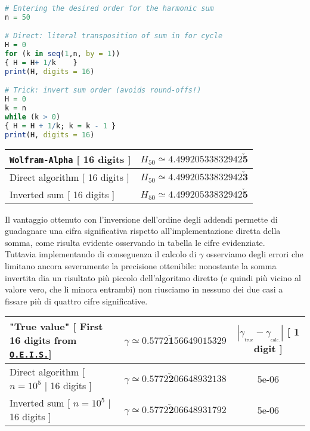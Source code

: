 \begin{lstlisting}[language=R, style=Rstyle, caption= \texttt{R} code for summing harmonic numbers, xleftmargin=.02\textwidth]
# Entering the desired order for the harmonic sum
n = 50

# Direct: literal transposition of sum in for cycle
H = 0
for (k in seq(1,n, by = 1))
{ H = H+ 1/k	} 
print(H, digits = 16)

# Trick: invert sum order (avoids round-offs!)
H = 0
k = n
while (k > 0)
{ H = H + 1/k; k = k - 1 }
print(H, digits = 16)
\end{lstlisting}

\bgroup
\def\arraystretch{2}
\begin{center}
	\begin{tabular}{l||c}
		\texttt{Wolfram-Alpha} [ 16 digits ]&$H_{50} \simeq 4.49920533832942\mathbf{\check{5}}$ \\  \hline
		Direct algorithm [ 16 digits ]&$H_{50} \simeq 4.49920533832942\mathbf{\check{3}}$ \\ 
		Inverted sum [ 16 digits ]&$H_{50} \simeq4.49920533832942\mathbf{\check{5}}$ \\ 
	\end{tabular}
\end{center}
\egroup

\noindent Il vantaggio ottenuto con l'inversione dell'ordine degli addendi permette di guadagnare una cifra significativa rispetto all'implementazione diretta della somma, come risulta evidente osservando in tabella le cifre evidenziate. \\

\noindent Tuttavia implementando di conseguenza il calcolo di $\gamma$ osserviamo degli errori che limitano ancora severamente la precisione ottenibile: nonostante la somma invertita dia un risultato più piccolo dell'algoritmo diretto (e quindi più vicino al valore vero, che li minora entrambi) non riusciamo in nessuno dei due casi a fissare più di quattro cifre significative. 

\bgroup
\def\arraystretch{2}
\begin{center}
	\begin{tabular}{l||c|c}
		"True value" [ First 16 digits from \href{https://oeis.org/A001620}{\texttt{O.E.I.S.}}] &$\gamma \simeq 0.5772\mathbf{\check{1}}56649015329$  &$|\gamma_{_\mathrm{true}}  - \gamma_{_\mathrm{calc.}} |$ [ 1 digit ]\\  \hline
		Direct algorithm [ $n=10^5$ | 16 digits ]&$\gamma \simeq 0.5772\mathbf{\check{2}}06648932138$ & 5e-06 \\ 
		Inverted sum [ $n=10^5$ | 16 digits ]&$\gamma \simeq0.5772\mathbf{\check{2}}06648931792$ & 5e-06\\ 
	\end{tabular}
\end{center}
\egroup

